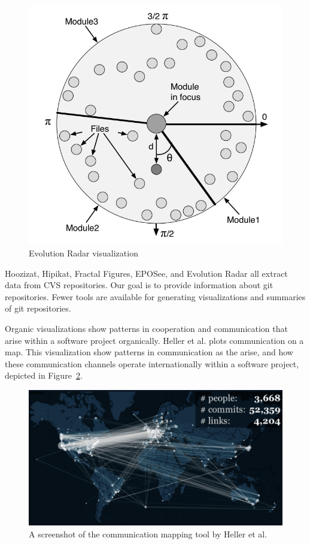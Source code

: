\begin{figure}[htpb]
  \centering
  \includegraphics[width=0.8\linewidth]{Figures/introduction/evo_radar.png}
  \caption{Evolution Radar visualization}
  \label{fig:evolution_radar}
\end{figure}

Hoozizat, Hipikat, Fractal Figures, EPOSee, and Evolution Radar all
extract data from CVS repositories. Our goal is to provide information
about git repositories. Fewer tools are available for generating
visualizations and summaries of git repositories.

Organic visualizations show patterns in cooperation and communication
that arise within a software project organically.
Heller et al.\cite{Heller2011} plots communication on a map.
This visualization show patterns in communication as the arise, and how
these communication channels operate internationally within a software
project, depicted in Figure~\ref{fig:heller_map}.

\begin{figure}[htpb]
  \centering
  \includegraphics[width=0.8\linewidth]{Figures/background/heller_map.png}
  \caption{A screenshot of the communication mapping tool by Heller et
    al.\cite{Heller2011}}
  \label{fig:heller_map}
\end{figure}

